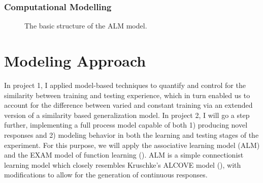 \documentclass[
  letterpaper,
  DIV=11,
  numbers=noendperiod,
  oneside]{scrartcl}
\begin{document}
\subsubsection{Computational Modelling}\label{computational-modelling}

\begin{figure}


\caption{\label{fig-alm-diagram}The basic structure of the ALM model.}

\end{figure}%

\newpage{}

\section{Modeling Approach}\label{modeling-approach}

In project 1, I applied model-based techniques to quantify and control
for the similarity between training and testing experience, which in
turn enabled us to account for the difference between varied and
constant training via an extended version of a similarity based
generalization model. In project 2, I will go a step further,
implementing a full process model capable of both 1) producing novel
responses and 2) modeling behavior in both the learning and testing
stages of the experiment. For this purpose, we will apply the
associative learning model (ALM) and the EXAM model of function learning
().
ALM is a simple connectionist learning model which closely resembles
Kruschke's ALCOVE model
(), with modifications to allow for the generation of continuous
responses.
\end{document}
